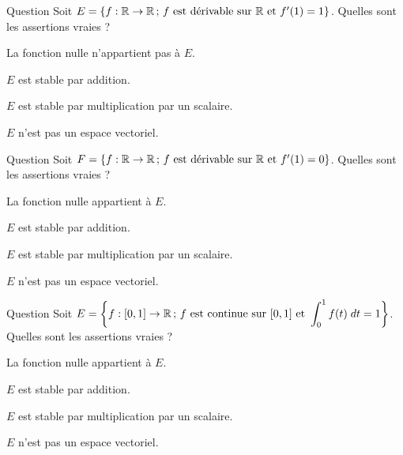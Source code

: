\begin{multi}[multiple,feedback=
{La fonction nulle n'appartient pas à \(E\), donc \(E\) n'est pas  un espace vectoriel. On vérifie que \(E\) est n'est stable ni par addition ni par  multiplication par un scalaire. 
}]{Question}
Soit \(E=\{f :\mathbb{R}\to \mathbb{R}\, ;\, f\mbox{ est dérivable sur }\mathbb{R}   \mbox{ et }f'(1)=1\}\). Quelles sont les assertions vraies ?

    \item* La fonction nulle n'appartient pas à \(E\).
    \item \(E\) est stable par addition.
    \item \(E\) est stable par multiplication par un scalaire.
    \item* \(E\) n'est pas un espace vectoriel.
\end{multi}


\begin{multi}[multiple,feedback=
{La fonction nulle appartient à \(E\), et \(E\) est stable par addition et par multiplication par un scalaire. Donc \(E\) est un espace vectoriel.
}]{Question}
Soit \(F=\{f:\mathbb{R} \to \mathbb{R} \, ; \, f\mbox{ est dérivable sur }\mathbb{R} \mbox{ et }f'(1)=0\}\). Quelles sont les assertions vraies ?

    \item* La fonction nulle appartient à \(E\).
    \item* \(E\) est stable par addition.
    \item* \(E\) est stable par multiplication par un scalaire.
    \item \(E\) n'est pas un espace vectoriel.
\end{multi}


\begin{multi}[multiple,feedback=
{La fonction nulle n'appartient pas à \(E\), donc \(E\) n'est pas un espace vectoriel. Par ailleurs, \(E\) n'est sable ni par addition ni par multiplication par un scalaire.
}]{Question}
Soit \(\displaystyle E =\left\{f :[0,1] \to \mathbb{R} \, ; \, f\mbox{ est continue sur } [0,1]\mbox{ et }\int_0^1 f(t) \; dt =1\right\}\). Quelles sont les assertions vraies ?

    \item La fonction nulle appartient à \(E\).
    \item \(E\) est stable par addition.
    \item \(E\) est stable par multiplication par un scalaire.
    \item* \(E\) n'est pas un espace vectoriel.
\end{multi}


